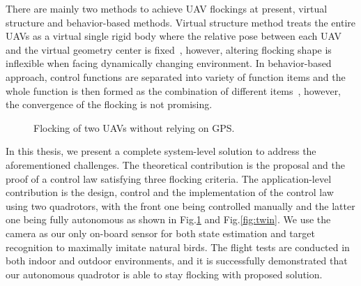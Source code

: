 There are mainly two methods to achieve UAV flockings at present, virtual structure and behavior-based methods. Virtual structure method treats the entire UAVs as a virtual single rigid body where the relative pose between each UAV and the virtual geometry center is fixed~\cite{Virtual2008,Askari2015,Cai2012}, however, altering flocking shape is inflexible when facing dynamically changing environment. In behavior-based approach, control functions are separated into variety of function items and the whole function is then formed as the combination of different items~\cite{Zhang2018,Martin2014,Vicsek2018}, however, the convergence of the flocking is not promising.

\begin{figure}[htb]
  \centering
  \caption{Flocking of two UAVs without relying on GPS.}\label{fig:indoor_outdoor}
\end{figure}

In this thesis, we present a complete system-level solution to address the aforementioned challenges. The theoretical contribution is the proposal and the proof of a control law satisfying three flocking criteria. The application-level contribution is the design, control and the implementation of the control law using two quadrotors, with the front one being controlled manually and the latter one being fully autonomous as shown in Fig.\ref{fig:indoor_outdoor} and Fig.\ref{fig:twin}. We use the camera as our only on-board sensor for both state estimation and target recognition to maximally imitate natural birds. The flight tests are conducted in both indoor and outdoor environments, and it is successfully demonstrated that our autonomous quadrotor is able to stay flocking with proposed solution.

